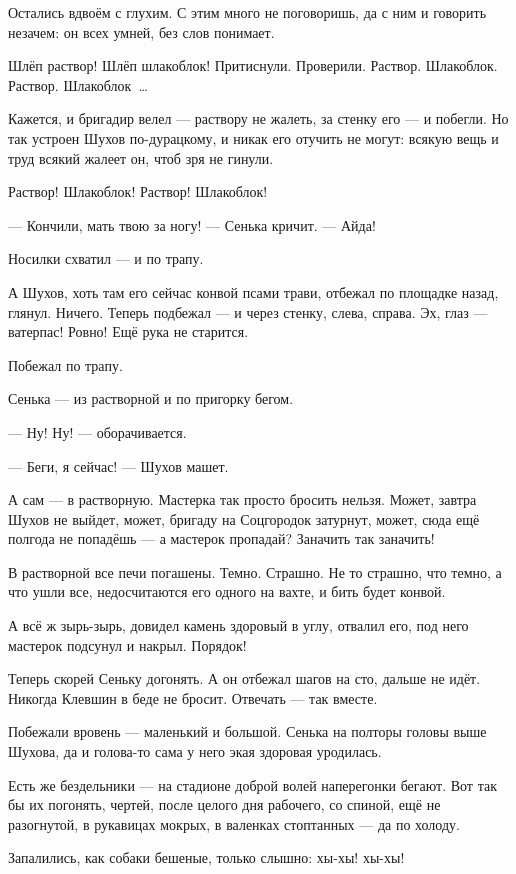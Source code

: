 Остались вдвоём с глухим. С этим много не поговоришь, да с ним и говорить незачем: он всех 
умней, без слов понимает.

Шлёп раствор! Шлёп шлакоблок! Притиснули. Проверили. Раствор. Шлакоблок. Раствор. 
Шлакоблок~\dots{}

Кажется, и бригадир велел --- раствору не жалеть, за стенку его --- и побегли. Но так устроен 
Шухов по-дурацкому, и никак его отучить не могут: всякую вещь и труд всякий жалеет он, чтоб 
зря не гинули.

Раствор! Шлакоблок! Раствор! Шлакоблок!

--- Кончили, мать твою за ногу! --- Сенька кричит. --- Айда!

Носилки схватил --- и по трапу.

А Шухов, хоть там его сейчас конвой псами трави, отбежал по площадке назад, глянул. Ничего. 
Теперь подбежал --- и через стенку, слева, справа. Эх, глаз --- ватерпас! Ровно! Ещё рука не 
старится.

Побежал по трапу.

Сенька --- из растворной и по пригорку бегом.

--- Ну! Ну! --- оборачивается.

--- Беги, я сейчас! --- Шухов машет.

А сам --- в растворную. Мастерка так просто бросить нельзя. Может, завтра Шухов не выйдет, 
может, бригаду на Соцгородок затурнут, может, сюда ещё полгода не попадёшь --- а мастерок 
пропадай? Заначить так заначить!

В растворной все печи погашены. Темно. Страшно. Не то страшно, что темно, а что ушли все, 
недосчитаются его одного на вахте, и бить будет конвой.

А всё ж зырь-зырь, довидел камень здоровый в углу, отвалил его, под него мастерок подсунул и 
накрыл. Порядок!

Теперь скорей Сеньку догонять. А он отбежал шагов на сто, дальше не идёт. Никогда Клевшин в 
беде не бросит. Отвечать --- так вместе.

Побежали вровень --- маленький и большой. Сенька на полторы головы выше Шухова, да и голова-то 
сама у него экая здоровая уродилась.

Есть же бездельники --- на стадионе доброй волей наперегонки бегают. Вот так бы их погонять, 
чертей, после целого дня рабочего, со спиной, ещё не разогнутой, в рукавицах мокрых, в 
валенках стоптанных --- да по холоду.

Запалились, как собаки бешеные, только слышно: хы-хы! хы-хы!

